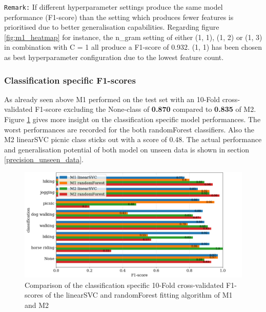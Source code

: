 \texttt{Remark:} If different hyperparameter settings produce the same model performance (F1-score) than the setting which produces fewer features is prioritised due to better generalisation capabilities. Regarding figure \ref{fig:m1_heatmap} for instance, the n\_gram setting of either (1, 1), (1, 2) or (1, 3) in combination with C = 1 all produce a F1-score of 0.932. (1, 1) has been chosen as best hyperparameter configuration due to the lowest feature count.

\subsubsection{Classification specific F1-scores}
As already seen above M1 performed on the test set with an 10-Fold cross-validated F1-score excluding the None-class of \textbf{0.870} compared to \textbf{0.835} of M2. Figure \ref{fig:m1_m2_class_f1_scores} gives more insight on the classification specific model performances. The worst performances are recorded for the both randomForest classifiers. Also the M2 linearSVC picnic class sticks out with a score of 0.48. The actual performance and generalisation potential of both model on unseen data is shown in section \ref{precision_unseen_data}.
\begin{figure}[h!]
   \centering
   \includegraphics[width=\textwidth]{img/m1_m2_class_f1_scores_bigger_font.pdf}
   \caption{Comparison of the classification specific 10-Fold cross-validated F1-scores of the linearSVC and randomForest fitting algorithm of M1 and M2}
   \label{fig:m1_m2_class_f1_scores}
\end{figure}

